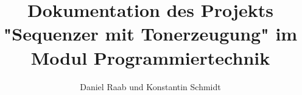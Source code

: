 \documentclass[12pt, a4paper, german]{article}
\title{Dokumentation des Projekts "Sequenzer mit Tonerzeugung" im Modul Programmiertechnik}
\author{Daniel Raab und Konstantin Schmidt}
\begin{document}
\def\startlcdtable{
	\begin{figure}[h]
	\ttfamily
	\centering
	\setlength{\tabcolsep}{2pt} %
	\begin{tabular}{|cccccccccccccccc|}
	\hline
}
\def\endlcdtable#1#2{
	\hline
	\end{tabular}
	\normalfont
	\caption{#1}
	\label{#2}
	\end{figure}
}

\newcommand{\lcdtext}[1] {\texttt{\framebox[1.1\width]{#1}}}

\newcommand{\source}[1] {\texttt{#1}}

\newcommand{\xydiagram}[3]{
	\begin{figure}[h]
	\centering
	\[
	\begin{xy}
	\xymatrix {
		#1
	}
	\end{xy}
	\]
	\caption{#2}
	\label{#3}
	\end{figure}
}


\maketitle
\tableofcontents








\end{document}
